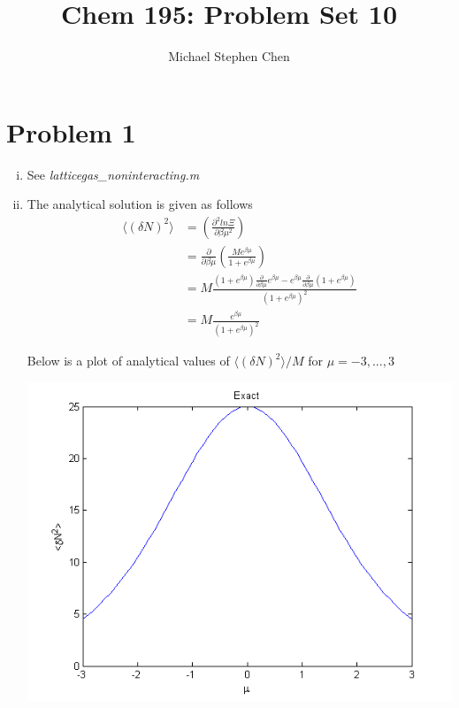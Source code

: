 \documentclass{article}
\title{Chem 195: Problem Set 10}
\author{Michael Stephen Chen}
\begin{document}
\maketitle
\pagebreak

\section*{Problem 1}
\begin{enumerate}[i.]
  \item See \textit{latticegas\_noninteracting.m}

  \item The analytical solution is given as follows
    \begin{align}
      \langle (\delta N)^2 \rangle &= \left( \frac{\partial^2 ln\Xi}{\partial \beta \mu^2} \right) \\
      &= \frac{\partial}{\partial\beta \mu} \left( \frac{M e^{\beta\mu}}{1 + e^{\beta\mu}}\right) \\
      &= M \frac{(1 + e^{\beta\mu}) \frac{\partial}{\partial\beta \mu} e^{\beta\mu} - e^{\beta\mu} \frac{\partial}{\partial\beta \mu}(1 + e^{\beta\mu})}{(1 + e^{\beta\mu})^2} \\
      &= M \frac{e^{\beta\mu}}{(1 + e^{\beta\mu})^2}
    \end{align}

    Below is a plot of analytical values of $\langle (\delta N)^2 \rangle / M$ for $\mu = -3,...,3$
    \begin{center}
      \includegraphics[scale=0.5]{prob1ii}
    \end{center}


\end{enumerate}
\end{document}
